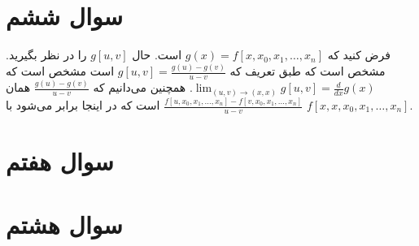\documentclass[]{article}
\begin{document}
\section*{سوال ششم}
فرض کنید که
$g(x) = f[x, x_0, x_1, \dots, x_n]$
است. حال
$g[u, v]$
را در نظر بگیرید. مشخص است که طبق تعریف که
$g[u, v] = \frac{g(u) - g(v)}{u - v}$
است مشخص است که
$\lim_{(u, v) \rightarrow (x, x)} g[u, v] = \frac{d}{dx} g(x)$.
همچنین می‌دانیم که
$\frac{g(u) - g(v)}{u - v}$
همان
$\frac{f[u, x_0, x_1, \dots, x_n] - f[v, x_0, x_1, \dots, x_n]}{u - v}$
است که در اینجا برابر می‌شود با
$f[x, x, x_0, x_1, \dots, x_n]$.
\section*{سوال هفتم}
\section*{سوال هشتم}
\end{document}

